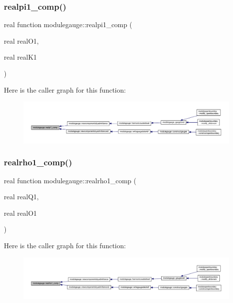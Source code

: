 \subsubsection{\texorpdfstring{realpi1\+\_\+comp()}{realpi1\_comp()}}
{\footnotesize\ttfamily real function modulegauge\+::realpi1\+\_\+comp (\begin{DoxyParamCaption}\item[{real}]{real\+O1,  }\item[{real}]{real\+K1 }\end{DoxyParamCaption})\hspace{0.3cm}{\ttfamily [private]}}

Here is the caller graph for this function\+:\nopagebreak
\begin{figure}[H]
\begin{center}
\leavevmode
\includegraphics[width=350pt]{namespacemodulegauge_a09dbdb08ae03c360a014f9a99d18930d_icgraph}
\end{center}
\end{figure}
\mbox{\label{namespacemodulegauge_aa1a4b7af3abfc8dfce0801b6c016f928}} 
\subsubsection{\texorpdfstring{realrho1\+\_\+comp()}{realrho1\_comp()}}
{\footnotesize\ttfamily real function modulegauge\+::realrho1\+\_\+comp (\begin{DoxyParamCaption}\item[{real}]{real\+Q1,  }\item[{real}]{real\+O1 }\end{DoxyParamCaption})\hspace{0.3cm}{\ttfamily [private]}}

Here is the caller graph for this function\+:\nopagebreak
\begin{figure}[H]
\begin{center}
\leavevmode
\includegraphics[width=350pt]{namespacemodulegauge_aa1a4b7af3abfc8dfce0801b6c016f928_icgraph}
\end{center}
\end{figure}
\mbox{\label{namespacemodulegauge_a639e6e7756ddc09a7f1410460b232db1}} 
